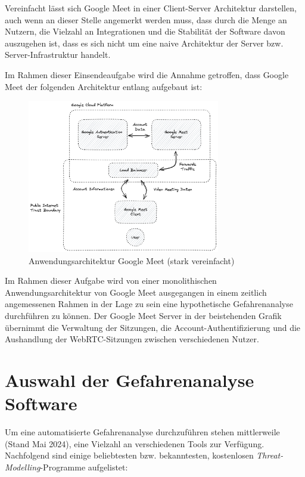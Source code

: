 \documentclass{article}
\begin{document}
Vereinfacht lässt sich Google Meet in einer Client-Server Architektur darstellen, auch 
wenn an dieser Stelle angemerkt werden muss, dass durch die Menge an Nutzern, die Vielzahl 
an Integrationen und die Stabilität der Software davon auszugehen ist, dass es sich nicht 
um eine naive Architektur der Server bzw. Server-Infrastruktur handelt. 

Im Rahmen dieser Einsendeaufgabe wird die Annahme getroffen, dass Google Meet der 
folgenden Architektur entlang aufgebaut ist:

\begin{figure}[H]
	\includegraphics[width=0.75\textwidth]{./google-meet-diagram.png}
	\centering
	\caption{Anwendungsarchitektur Google Meet (stark vereinfacht)}
\end{figure}

Im Rahmen dieser Aufgabe wird von einer monolithischen Anwendungsarchitektur von Google 
Meet ausgegangen in einem zeitlich angemessenen Rahmen in der Lage zu sein eine 
hypothetische Gefahrenanalyse durchführen zu können. Der Google Meet Server in der 
beistehenden Grafik übernimmt die Verwaltung der Sitzungen, die Account-Authentifizierung 
und die Aushandlung der WebRTC-Sitzungen zwischen verschiedenen Nutzer.

\section{Auswahl der Gefahrenanalyse Software}

Um eine automatisierte Gefahrenanalyse durchzuführen stehen mittlerweile (Stand Mai 2024), 
eine Vielzahl an verschiedenen Tools zur Verfügung. Nachfolgend sind einige beliebtesten 
bzw. bekanntesten, kostenlosen \textit{Threat-Modelling}-Programme aufgelistet:
\end{document}
